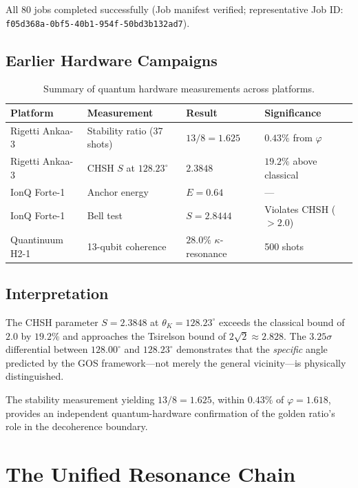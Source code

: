 \documentclass[12pt,a4paper]{article}
\theoremstyle{plain}
\theoremstyle{definition}
\newcommand{\thetaK}{\theta_K}
\newcommand{\golden}{\varphi}
\newcommand{\kap}{\kappa}
\begin{document}
All 80 jobs completed successfully (Job manifest verified; representative Job ID: \texttt{f05d368a-0bf5-40b1-954f-50bd3b132ad7}).

\subsection{Earlier Hardware Campaigns}

\begin{table}[H]
\centering
\caption{Summary of quantum hardware measurements across platforms.}
\label{tab:hardware_summary}
\renewcommand{\arraystretch}{1.3}
\begin{tabular}{llll}
\toprule
\textbf{Platform} & \textbf{Measurement} & \textbf{Result} & \textbf{Significance} \\
\midrule
Rigetti Ankaa-3 & Stability ratio (37 shots) & $13/8 = 1.625$ & $0.43\%$ from $\golden$ \\
Rigetti Ankaa-3 & CHSH $S$ at $128.23^\circ$ & $2.3848$ & $19.2\%$ above classical \\
IonQ Forte-1 & Anchor energy & $E = 0.64$ & --- \\
IonQ Forte-1 & Bell test & $S = 2.8444$ & Violates CHSH ($>2.0$) \\
Quantinuum H2-1 & 13-qubit coherence & $28.0\%$ $\kap$-resonance & 500 shots \\
\bottomrule
\end{tabular}
\end{table}

\subsection{Interpretation}

The CHSH parameter $S = 2.3848$ at $\thetaK = 128.23^\circ$ exceeds the classical bound of $2.0$ by $19.2\%$ and approaches the Tsirelson bound of $2\sqrt{2} \approx 2.828$. The $3.25\sigma$ differential between $128.00^\circ$ and $128.23^\circ$ demonstrates that the \emph{specific} angle predicted by the GOS framework---not merely the general vicinity---is physically distinguished.

The stability measurement yielding $13/8 = 1.625$, within $0.43\%$ of $\golden = 1.618$, provides an independent quantum-hardware confirmation of the golden ratio's role in the decoherence boundary.

\section{The Unified Resonance Chain}
\label{sec:chain}
\end{document}
